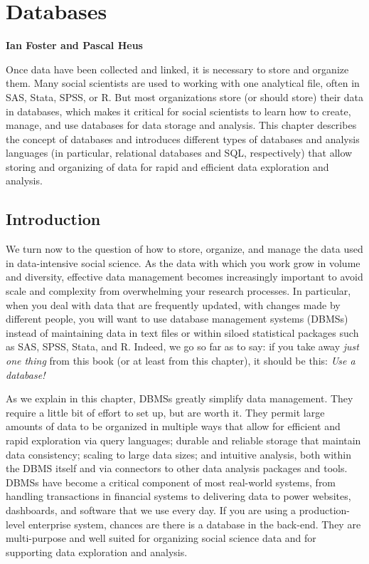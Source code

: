 \documentclass[]{krantz}
\begin{document}
\hypertarget{chap:db}{\chapter{Databases}\label{chap:db}}

\textbf{Ian Foster and Pascal Heus}

Once data have been collected and linked, it is necessary to store and
organize them. Many social scientists are used to working with one
analytical file, often in SAS, Stata, SPSS, or R. But most organizations
store (or should store) their data in databases, which makes it critical
for social scientists to learn how to create, manage, and use databases
for data storage and analysis. This chapter describes the concept of
databases and introduces different types of databases and analysis
languages (in particular, relational databases and SQL, respectively)
that allow storing and organizing of data for rapid and efficient data
exploration and analysis.

\section{Introduction}\label{sec:db:intro}

We turn now to the question of how to store, organize, and manage the
data used in data-intensive social science. As the data with which you
work grow in volume and diversity, effective data management becomes
increasingly important to avoid scale and complexity from overwhelming
your research processes. In particular, when you deal with data that are
frequently updated, with changes made by different people, you will want
to use database management systems (DBMSs) instead of maintaining data
in text files or within siloed statistical packages such as SAS, SPSS,
Stata, and R. Indeed, we go so far as to say: if you take away
\emph{just one thing} from this book (or at least from this chapter), it
should be this: \emph{Use a database!}

As we explain in this chapter, DBMSs greatly simplify data management.
They require a little bit of effort to set up, but are worth it. They
permit large amounts of data to be organized in multiple ways that allow
for efficient and rapid exploration via query languages; durable and
reliable storage that maintain data consistency; scaling to large data
sizes; and intuitive analysis, both within the DBMS itself and via
connectors to other data analysis packages and tools. DBMSs have become
a critical component of most real-world systems, from handling
transactions in financial systems to delivering data to power websites,
dashboards, and software that we use every day. If you are using a
production-level enterprise system, chances are there is a database in
the back-end. They are multi-purpose and well suited for organizing
social science data and for supporting data exploration and analysis.
\end{document}
